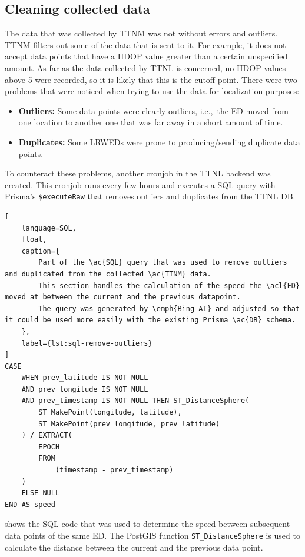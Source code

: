 \subsection{Cleaning collected data}\label{subsec:cleaning-collected-data}

The data that was collected by \ac{TTNM} was not without errors and outliers.
\ac{TTNM} filters out some of the data that is sent to it.
For example, it does not accept data points that have a \ac{HDOP} value greater than a certain unspecified amount.
As far as the data collected by \ac{TTNL} is concerned, no \ac{HDOP} values above 5 were recorded, so it is likely that this is the cutoff point.
There were two problems that were noticed when trying to use the data for localization purposes:

\begin{itemize}
    \item \textbf{Outliers:} Some data points were clearly outliers, i.e.,\ the \acl{ED} moved from one location to another one that was far away in a short amount of time.
    \item \textbf{Duplicates:} Some \aclp{LRWED} were prone to producing/sending duplicate data points.
\end{itemize}

To counteract these problems, another cronjob in the \ac{TTNL} backend was created.
This cronjob runs every few hours and executes a \ac{SQL} query with Prisma's \lstinline|$executeRaw| that removes outliers and duplicates from the \ac{TTNL} \ac{DB}.

\begin{lstlisting}[
    language=SQL,
    float,
    caption={
        Part of the \ac{SQL} query that was used to remove outliers and duplicated from the collected \ac{TTNM} data.
        This section handles the calculation of the speed the \acl{ED} moved at between the current and the previous datapoint.
        The query was generated by \emph{Bing AI} and adjusted so that it could be used more easily with the existing Prisma \ac{DB} schema.
    },
    label={lst:sql-remove-outliers}
]
CASE
    WHEN prev_latitude IS NOT NULL
    AND prev_longitude IS NOT NULL
    AND prev_timestamp IS NOT NULL THEN ST_DistanceSphere(
        ST_MakePoint(longitude, latitude),
        ST_MakePoint(prev_longitude, prev_latitude)
    ) / EXTRACT(
        EPOCH
        FROM
            (timestamp - prev_timestamp)
    )
    ELSE NULL
END AS speed
\end{lstlisting}

 shows the \ac{SQL} code that was used to determine the speed between subsequent data points of the same \acl{ED}.
The PostGIS function \lstinline|ST_DistanceSphere| is used to calculate the distance between the current and the previous data point.

